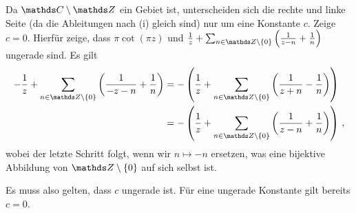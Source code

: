\begin{bewe-list}
Da $\CC\setminus\ZZ$ ein Gebiet ist, unterscheiden sich die rechte und linke Seite (da die Ableitungen nach (i) gleich sind) nur um eine Konstante $c$.
Zeige $c=0$.
Hierfür zeige, dass $\pi \cot(\pi z)$ und $\frac{1}{z} + \sum _{n \in \ZZ\setminus\{0\}} \left( \frac{1}{z-n} + \frac{1}{n}\right)$ ungerade sind.
Es gilt
\begin{align*}
	-\frac{1}{z} + \sum _{n \in \ZZ\setminus\{0\}} \left( \frac{1}{-z-n} + \frac{1}{n}\right)
	&= - \left(\frac{1}{z} + \sum _{n \in \ZZ\setminus\{0\}} \left( \frac{1}{z+n} - \frac{1}{n}\right)\right) \\
	&= - \left(\frac{1}{z} + \sum _{n \in \ZZ\setminus\{0\}} \left( \frac{1}{z-n} + \frac{1}{n}\right)\right)
	\,,
\end{align*}
wobei der letzte Schritt folgt, wenn wir $n \mapsto -n$ ersetzen, was eine bijektive Abbildung von $\ZZ \setminus\{0\}$ auf sich selbst ist.

Es muss also gelten, dass $c$ ungerade ist.
Für eine ungerade Konstante gilt bereits $c=0$.
\end{bewe-list}